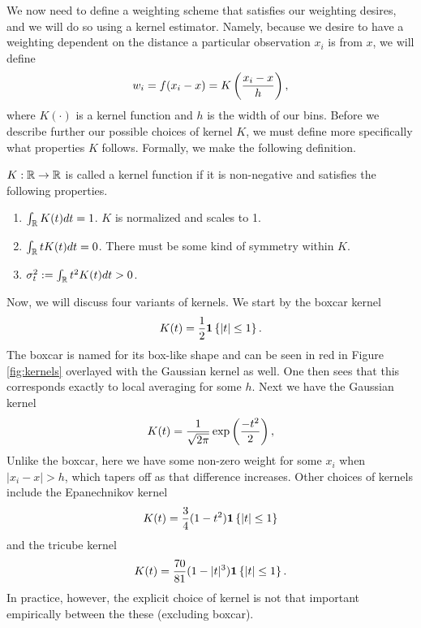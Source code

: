 We now need to define a weighting scheme that satisfies our weighting desires, and we will do so using a kernel estimator. Namely, because we desire to have a weighting dependent on the distance a particular observation $x_i$ is from $x$, we will define 
\begin{equation}
w_i = f(x_i -x) = K\left(\frac{x_i -x}{h}\right),
\end{equation}
where $K(\cdot)$ is a kernel function and $h$ is the width of our bins. 
Before we describe further our possible choices of kernel $K$, we must define more specifically what properties $K$ follows. Formally, we make the following definition.
\begin{definition} $K: \mathbb R \to \mathbb R$ is called a kernel function if it is non-negative and satisfies the following properties.
	\begin{enumerate}
		\item $\int_{\mathbb R} K(t) dt = 1$. $K$ is normalized and scales to 1. 
		\item $\int_{\mathbb R} tK(t)dt = 0$. There must be some kind of symmetry within $K$. 
		\item $\sigma_t^2 := \int_{\mathbb R} t^2 K(t) dt > 0$.
	\end{enumerate}
\end{definition}
Now, we will discuss four variants of kernels. We start by the boxcar kernel
\begin{equation}K(t) = \frac{1}{2}\bm{1}\left\{|t| \leq 1\right\}.\end{equation} 
The boxcar is named for its box-like shape and can be seen in red in Figure \ref{fig:kernels} overlayed with the Gaussian kernel as well. One then sees that this corresponds exactly to local averaging for some $h$.  Next we have the Gaussian kernel
 \begin{equation}K(t) = \frac{1}{\sqrt{2\pi}}\exp\left(\frac{-t^2}{2}\right),\end{equation}
Unlike the boxcar, here we have some non-zero weight for some $x_i$ when $|x_i - x| > h$, which tapers off as that difference increases. Other choices of kernels include the Epanechnikov kernel 
\begin{equation}
	K(t) = \frac{3}{4}(1 - t^2)\bm{1} \left\{|t| \leq 1\right\}
\end{equation}
and the tricube kernel
\begin{equation}
	K(t) = \frac{70}{81}(1 - |t|^3)\bm{1} \left\{|t| \leq 1\right\}.
\end{equation}
In practice, however, the explicit choice of kernel is not that important empirically between the these (excluding boxcar). 

